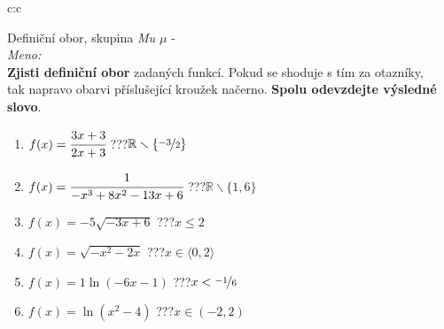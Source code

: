 \documentclass[10pt]{report}
\begin{document}
\newpage
\thispagestyle{empty}
\begin{tabular}{c:c}
\begin{minipage}[c][99mm][t]{0.49\linewidth}
\begin{center}
\vspace{7mm}
{\huge Definiční obor, skupina \textit{Mu $\mu$} -}\\[4.5mm]
\textit{Meno:}\phantom{xxxxxxxxxxxxxxxxxxxxxxxxxxxxxxxxxxxxxxxxxxxxxxxxxxxxxxxxxxxxxxxxx}\\[3.5mm]
\textbf{Zjisti definiční obor} zadaných funkcí. Pokud se shoduje s tím za otazníky,\\tak napravo obarvi příslušející kroužek načerno. \textbf{Spolu odevzdejte výsledné slovo}.\\[3mm]
\begin{minipage}{0.77\linewidth}
\begin{center}
\begin{varwidth}{\textwidth}
\begin{enumerate}
\normalsize
\item $f(x)=\cfrac{3x+3}{2x+3}$\quad \dotfill\; ???\;\dotfill \quad $\mathbb{R}\smallsetminus\{\nicefrac{-3}{2}\}$
\item $f(x)=\cfrac{1}{-x^3+8x^2-13x+6}$\quad \dotfill\; ???\;\dotfill \quad $\mathbb{R}\smallsetminus\{1,6\}$
\item $f(x)=-5\sqrt{-3x+6}$\quad \dotfill\; ???\;\dotfill \quad $x\leq2$
\item $f(x)=\sqrt{-x^2-2x}$\quad \dotfill\; ???\;\dotfill \quad $x\in\langle0 , 2\rangle$
\item $f(x)=1\ln{(-6x-1)}$\quad \dotfill\; ???\;\dotfill \quad $x<\nicefrac{-1}{6}$
\item $f(x)=\ln{(x^2-4)}$\quad \dotfill\; ???\;\dotfill \quad $x\in(-2 , 2)$
\end{enumerate}
\end{varwidth}
\end{center}
\end{minipage}
\begin{minipage}{0.20\linewidth}

\end{minipage}
\end{center}
\end{minipage}
\end{tabular}
\end{document}
